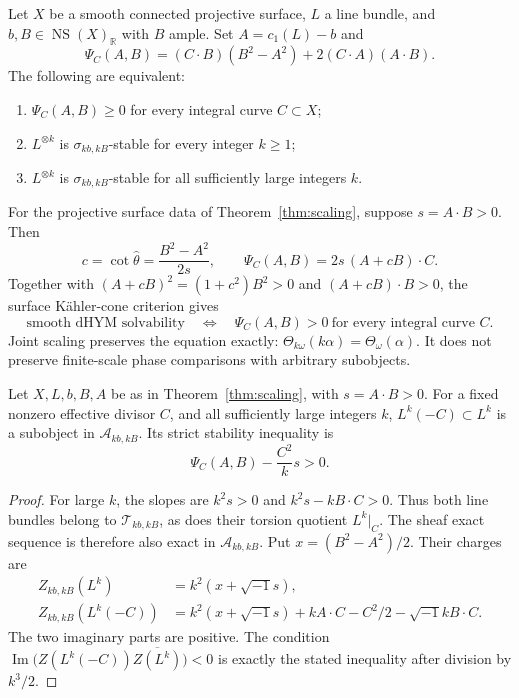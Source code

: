 \documentclass[12pt,reqno]{amsart}
\newcommand{\ii}{\sqrt{-1}}
\newcommand{\R}{\mathbb R}
\newcommand{\NS}{\operatorname{NS}}
\newcommand{\Ima}{\operatorname{Im}}
\begin{document}
\begin{theorem}\label{thm:scaling}
Let $X$ be a smooth connected projective surface, $L$ a line bundle,
and $b,B\in\NS(X)_\R$ with $B$ ample. Set $A=c_1(L)-b$ and
\[
 \Psi_C(A,B)=(C\cdot B)(B^2-A^2)+2(C\cdot A)(A\cdot B).
\]
The following are equivalent:
\begin{enumerate}
\item $\Psi_C(A,B)\ge0$ for every integral curve $C\subset X$;
\item $L^{\otimes k}$ is $\sigma_{kb,kB}$-stable for every integer $k\ge1$;
\item $L^{\otimes k}$ is $\sigma_{kb,kB}$-stable for all sufficiently large integers $k$.
\end{enumerate}
\end{theorem}

For the projective surface data of Theorem~\ref{thm:scaling}, suppose $s=A\cdot B>0$. Then
\[
 c=\cot\widehat\theta=\frac{B^2-A^2}{2s},\qquad
 \Psi_C(A,B)=2s\,(A+cB)\cdot C.
\]
Together with $(A+cB)^2=(1+c^2)B^2>0$ and $(A+cB)\cdot B>0$, the surface K\"ahler-cone criterion gives
\[
 \text{smooth dHYM solvability}\quad\Longleftrightarrow\quad
 \Psi_C(A,B)>0\ \text{for every integral curve }C.
\]
Joint scaling preserves the equation exactly:
$\Theta_{k\omega}(k\alpha)=\Theta_\omega(\alpha)$.
It does not preserve finite-scale phase comparisons with arbitrary subobjects.

\begin{proposition}\label{prop:correction}
Let $X,L,b,B,A$ be as in Theorem~\ref{thm:scaling}, with $s=A\cdot B>0$.
For a fixed nonzero effective divisor $C$, and all sufficiently large integers $k$,
$L^k(-C)\subset L^k$ is a subobject in $\mathcal A_{kb,kB}$.
Its strict stability inequality is
\[
 \Psi_C(A,B)-\frac{C^2}{k}s>0.
\]
\end{proposition}
\begin{proof}\label{proof:correction}
For large $k$, the slopes are $k^2s>0$ and $k^2s-kB\cdot C>0$.
Thus both line bundles belong to $\mathcal T_{kb,kB}$, as does their torsion
quotient $L^k|_C$. The sheaf exact sequence is therefore also exact in
$\mathcal A_{kb,kB}$. Put $x=(B^2-A^2)/2$. Their charges are
\[
 \begin{aligned}
 Z_{kb,kB}(L^k)&=k^2(x+\ii s),\\
 Z_{kb,kB}(L^k(-C))&=k^2(x+\ii s)+kA\cdot C-C^2/2-\ii kB\cdot C.
 \end{aligned}
\]
The two imaginary parts are positive. The condition
$\Ima\bigl(Z(L^k(-C))\overline{Z(L^k)}\bigr)<0$
is exactly the stated inequality after division by $k^3/2$.
\end{proof}
\end{document}

